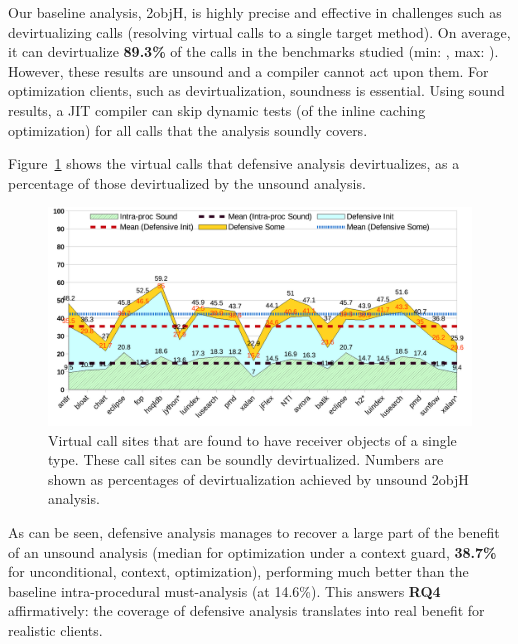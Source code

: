 Our baseline analysis, 2objH, is highly precise and effective in challenges such as devirtualizing calls (resolving virtual calls to a single target method). On average, it can devirtualize \textbf{89.3\%} of the calls in the benchmarks studied (min: , max: ). However, these results are unsound and a compiler cannot act upon them. For optimization clients, such as devirtualization, soundness is essential. Using sound results, a JIT compiler can skip dynamic tests (of the inline caching optimization) for all calls that the analysis soundly covers.

Figure~\ref{fig:sound:devirt1} shows the virtual calls that defensive analysis devirtualizes, as a percentage of those devirtualized by the unsound analysis.

\begin{figure}[tbh]
\centering
\includegraphics[width=\linewidth]{assets/defensive/devirt1.pdf}
\caption{Virtual call sites that are found to have receiver objects of a single type. These call sites can be soundly devirtualized. Numbers are shown as percentages of devirtualization achieved by unsound 2objH analysis.}
\label{fig:sound:devirt1}
\end{figure}

As can be seen, defensive analysis manages to recover a large part of the benefit of an unsound analysis (median  for optimization under a context guard, \textbf{38.7\%} for unconditional, \ctxInit{} context, optimization), performing much better than the baseline intra-procedural must-analysis (at 14.6\%). This answers \textbf{RQ4} affirmatively: the coverage of defensive analysis translates into real benefit for realistic clients.


